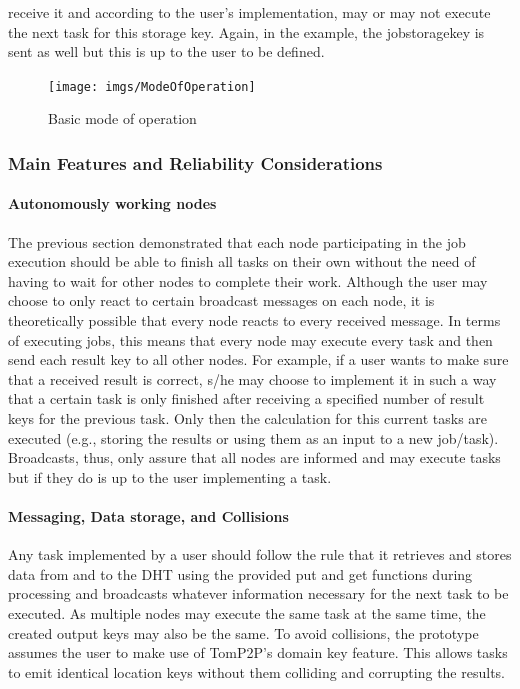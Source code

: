 receive it and according to the user's implementation, may or may not execute the next task for this storage key. Again, in the example, the jobstoragekey is sent as well but this is up to the user to be defined.
\begin{figure}
 	\centering	
 	\texttt{[image: imgs/ModeOfOperation]}
 	\caption{Basic mode of operation}	
 	\label{fig:modeofoperation}
\end{figure}  
\newline
\subsubsection{Main Features and Reliability Considerations}
\paragraph{Autonomously working nodes}
The previous section demonstrated that each node participating in the job execution should be able to finish all tasks on their own without the need of having to wait for other nodes to complete their work. Although the user may choose to only react to certain broadcast messages on each node, it is theoretically possible that every node reacts to every received message. In terms of executing jobs, this means that every node may execute every task and then send each result key to all other nodes. For example, if a user wants to make sure that a received result is correct, s/he may choose to implement it in such a way that a certain task is only finished after receiving a specified number of result keys for the previous task. Only then the calculation for this current tasks are executed (e.g., storing the results or using them as an input to a new job/task). Broadcasts, thus, only assure that all nodes are informed and may execute tasks but if they do is up to the user implementing a task. 
\paragraph{Messaging, Data storage, and Collisions}
Any task implemented by a user should follow the rule that it retrieves and stores data from and to the DHT using the provided put and get functions during processing and broadcasts whatever information necessary for the next task to be executed. As multiple nodes may execute the same task at the same time, the created output keys may also be the same. To avoid collisions, the prototype assumes the user to make use of TomP2P's domain key feature. This allows tasks to emit identical location keys without them colliding and corrupting the results. 
